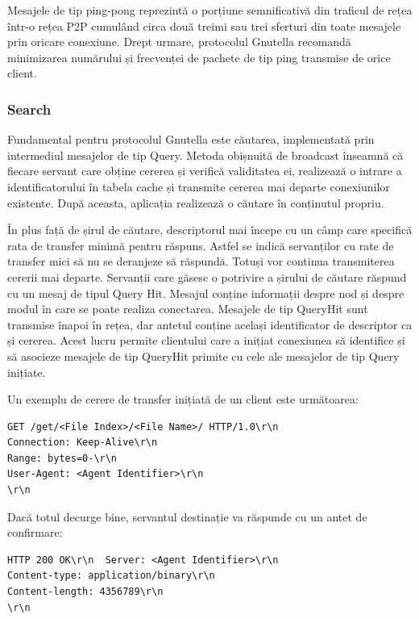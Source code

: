 Mesajele de tip ping-pong reprezintă o porțiune semnificativă din traficul de
rețea într-o rețea P2P cumulând circa două treimi sau trei sferturi din toate
mesajele prin oricare conexiune. Drept urmare, protocolul Gnutella recomandă
minimizarea numărului și frecvenței de pachete de tip ping transmise de orice
client.

\subsubsection{Search}

Fundamental pentru protocolul Gnutella este căutarea, implementată prin
intermediul mesajelor de tip Query. Metoda obișnuită de broadcast înseamnă că
fiecare servant care obține cererea și verifică validitatea ei, realizează o
intrare a identificatorului în tabela cache și transmite cererea mai departe
conexiunilor existente. După aceasta, aplicația realizează o căutare în
conținutul propriu.

În plus față de șirul de căutare, descriptorul mai începe cu un câmp care
specifică rata de transfer minimă pentru răspuns. Astfel se indică servanților
cu rate de transfer mici să nu se deranjeze să răspundă. Totuși vor continua
transmiterea cererii mai departe. Servanții care găsesc o potrivire a șirului
de căutare răspund cu un mesaj de tipul Query Hit. Mesajul conține informații
despre nod și despre modul în care se poate realiza conectarea. Mesajele de
tip QueryHit sunt transmise înapoi în rețea, dar antetul conține același
identificator de descriptor ca și cererea. Acest lucru permite clientului care
a inițiat conexiunea să identifice și să asocieze mesajele de tip QueryHit
primite cu cele ale mesajelor de tip Query inițiate.

Un exemplu de cerere de transfer inițiată de un client este următoarea:

\begin{verbatim}
GET /get/<File Index>/<File Name>/ HTTP/1.0\r\n
Connection: Keep-Alive\r\n
Range: bytes=0-\r\n
User-Agent: <Agent Identifier>\r\n
\r\n
\end{verbatim}

Dacă totul decurge bine, servantul destinație va răspunde cu un antet de
confirmare:

\begin{verbatim}
HTTP 200 OK\r\n  Server: <Agent Identifier>\r\n
Content-type: application/binary\r\n
Content-length: 4356789\r\n
\r\n
\end{verbatim}

